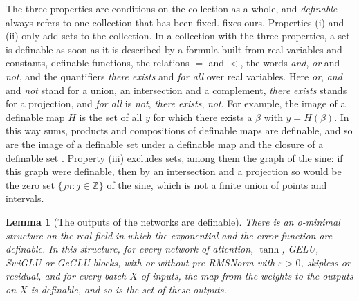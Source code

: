 \documentclass[10pt]{article}
\newtheorem{lemma}[theorem]{Lemma}
\theoremstyle{definition}
\theoremstyle{remark}
\begin{document}
The three properties are conditions on the collection as a whole, and \emph{definable} always refers to one collection that has been fixed.  fixes ours. Properties (i) and (ii) only add sets to the collection. In a collection with the three properties, a set is definable as soon as it is described by a formula built from real variables and constants, definable functions, the relations $=$ and $<$, the words \emph{and}, \emph{or} and \emph{not}, and the quantifiers \emph{there exists} and \emph{for all} over real variables. Here \emph{or}, \emph{and} and \emph{not} stand for a union, an intersection and a complement, \emph{there exists} stands for a projection, and \emph{for all} is \emph{not}, \emph{there exists}, \emph{not}. For example, the image of a definable map $H$ is the set of all $y$ for which there exists a $\beta$ with $y = H(\beta)$. In this way sums, products and compositions of definable maps are definable, and so are the image of a definable set under a definable map \citep[Chapter~1, Lemma~(2.3)]{vandendries1998tame} and the closure of a definable set \citep[Chapter~1, Lemma~(3.4)]{vandendries1998tame}. Property (iii) excludes sets, among them the graph of the sine: if this graph were definable, then by an intersection and a projection so would be the zero set $\{j\pi : j \in \mathbb{Z}\}$ of the sine, which is not a finite union of points and intervals.

\begin{lemma}[The outputs of the networks are definable]\label{lem:defnets}
There is an o-minimal structure on the real field in which the exponential and the error function are definable. In this structure, for every network of attention, $\tanh$, GELU, SwiGLU or GeGLU blocks, with or without pre-RMSNorm with $\varepsilon > 0$, skipless or residual, and for every batch $X$ of inputs, the map from the weights to the outputs on $X$ is definable, and so is the set of these outputs.
\end{lemma}
\end{document}
